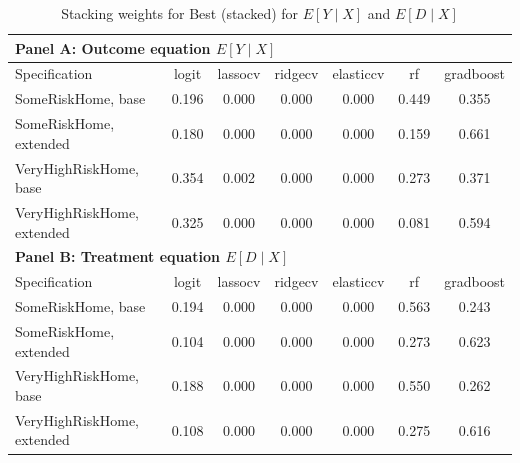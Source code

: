\begin{table}[htbp]\centering
\caption{Stacking weights for Best (stacked) for \(E[Y \mid X]\) and \(E[D \mid X]\)}
\begin{tabular}{lcccccc}
\toprule
\multicolumn{7}{l}{\textbf{Panel A: Outcome equation \(E[Y \mid X]\)}}\\
\midrule
Specification & logit & lassocv & ridgecv & elasticcv & rf & gradboost \\
\midrule
SomeRiskHome, base &  0.196 &  0.000 &  0.000 &  0.000 &  0.449 &  0.355 \\
SomeRiskHome, extended &  0.180 &  0.000 &  0.000 &  0.000 &  0.159 &  0.661 \\
VeryHighRiskHome, base &  0.354 &  0.002 &  0.000 &  0.000 &  0.273 &  0.371 \\
VeryHighRiskHome, extended &  0.325 &  0.000 &  0.000 &  0.000 &  0.081 &  0.594 \\
\midrule
\multicolumn{7}{l}{\textbf{Panel B: Treatment equation \(E[D \mid X]\)}}\\
\midrule
Specification & logit & lassocv & ridgecv & elasticcv & rf & gradboost \\
\midrule
SomeRiskHome, base &  0.194 &  0.000 &  0.000 &  0.000 &  0.563 &  0.243 \\
SomeRiskHome, extended &  0.104 &  0.000 &  0.000 &  0.000 &  0.273 &  0.623 \\
VeryHighRiskHome, base &  0.188 &  0.000 &  0.000 &  0.000 &  0.550 &  0.262 \\
VeryHighRiskHome, extended &  0.108 &  0.000 &  0.000 &  0.000 &  0.275 &  0.616 \\
\bottomrule
\end{tabular}
\end{table}
